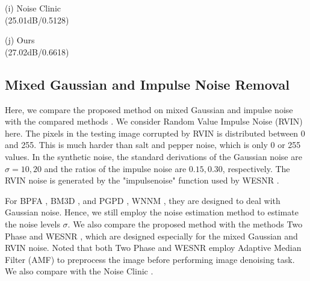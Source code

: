 \documentclass[runningheads]{llncs}
\begin{document}
\begin{figure*}
{\begin{minipage}[t]{0.2\textwidth}
{\footnotesize (i) Noise Clinic \\(25.01dB/0.5128)}
\end{minipage}
\begin{minipage}[t]{0.2\textwidth}
\centering
{}
{\footnotesize (j) Ours \\(27.02dB/0.6618)}
\end{minipage}
}
\vspace{-0.1in}
\caption{Denoised images of \textsl{Hill} and PSNR/SSIM results by different methods (the standard deviation of Gaussian noise is $\sigma=50$).}
\label{fig6}
\end{figure*}

\subsection{Mixed Gaussian and Impulse Noise Removal}
Here, we compare the proposed method on mixed Gaussian and impulse noise with the compared methods \cite{bpfa,bm3d,pgpd,wnnm,cai2010fast,wesnr,noiseclinic}. We consider Random Value Impulse Noise (RVIN) here. The pixels in the testing image corrupted by RVIN is distributed between 0 and 255. This is much harder than salt and pepper noise, which is only 0 or 255 values. In the synthetic noise, the standard derivations of the Gaussian noise are $\sigma=10, 20$ and the ratios of the impulse noise are $0.15, 0.30$, respectively. The RVIN noise is generated by the "impulsenoise" function used by WESNR \cite{wesnr}. 

For BPFA \cite{bpfa}, BM3D \cite{bm3d}, and PGPD \cite{pgpd}, WNNM \cite{wnnm}, they are designed to deal with Gaussian noise. Hence, we still employ the noise estimation method \cite{liu2013single} to estimate the noise levels $\sigma$. We also compare the proposed method with the methods Two Phase \cite{cai2010fast} and WESNR \cite{wesnr}, which are designed especially for the mixed Gaussian and RVIN noise. Noted that both Two Phase \cite{cai2010fast} and WESNR \cite{wesnr} employ Adaptive Median Filter (AMF) \cite{amf} to preprocess the image before performing image denoising task. We also compare with the Noise Clinic \cite{noiseclinic}.
\end{document}
